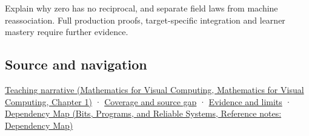 Explain why zero has no reciprocal, and separate field laws from machine reassociation. Full production proofs, target-specific integration and learner mastery require further evidence.

\subsection{Source and navigation}\label{appendix-52051ad550fe-source-and-navigation}

\href{../02-Mathematics-for-Visual-Computing/main.pdf\#nameddest=01-foundations-i-ch017-numbers-become-a-system-of-permitted-operations}{Teaching narrative (Mathematics for Visual Computing, Mathematics for Visual Computing, Chapter 1)} · \hyperref[appendix-fd090d982a15-phase-6---parts-501-600]{Coverage and source gap} · \hyperref[appendix-a103e7846d21-phase-6---source-analysis-and-verification]{Evidence and limits} · \href{../01-Bits-Programs-and-Reliable-Systems/main.pdf\#nameddest=appendix-4ad47bdd269a}{Dependency Map (Bits, Programs, and Reliable Systems, Reference notes: Dependency Map)}
